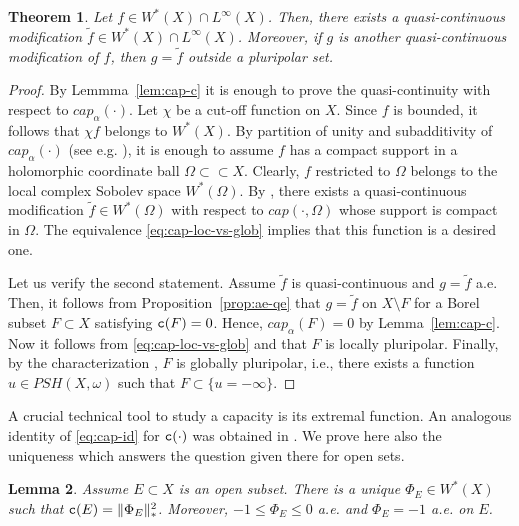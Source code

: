 \documentclass{amsart}
\newcommand{\wt}[1]{\widetilde{#1}}
\newcommand{\al}{\alpha}
\newcommand{\om}{\omega}
\newcommand{\tc}{{\tt c}}
\newcommand{\Om}{\Omega}
\newtheorem{thm}{Theorem}
\newtheorem{lem}[thm]{Lemma}
\theoremstyle{definition}
\numberwithin{thm}{section}
\numberwithin{equation}{section}
\renewcommand{\[}{\begin{equation}}
\renewcommand{\]}{\end{equation}}
\begin{document}
\begin{thm} \label{thm:quasi-mod-bdd} Let $f\in W^*(X) \cap L^\infty(X)$. Then, there exists a quasi-continuous modification $\wt f \in W^*(X) \cap L^\infty(X)$. Moreover, if $g$ is another quasi-continuous modification of $f$, then $g =\wt f$ outside a pluripolar set.
\end{thm}

\begin{proof} By Lemmma~\ref{lem:cap-c} it is enough to prove the quasi-continuity with respect to $cap_\al(\cdot)$. 
 Let $\chi$ be a cut-off function on $X$.  Since $f$ is bounded, it follows that $\chi f$ belongs to $W^*(X)$.  By partition of unity and subadditivity of $cap_\al (\cdot)$ (see e.g. \cite{GZ-book}), it is enough to assume $f$ has a compact support in  a holomorphic coordinate ball $\Om\subset \subset X$. Clearly, $f$ restricted to $\Om$ belongs to  the local complex Sobolev space $W^*(\Om)$. By \cite[Theorem~2.10]{DMV}, there exists a quasi-continuous modification $\wt f \in W^*(\Om)$ with respect to $cap(\cdot, \Om)$ whose support is compact in $\Om$. The equivalence \eqref{eq:cap-loc-vs-glob} implies that this function is a desired one. 

Let us verify the second statement. Assume $\wt f$ is quasi-continuous and $g= \wt f$ a.e. Then, it follows from Proposition~\ref{prop:ae-qe} that $g = \wt f $ on $X\setminus F$ for  a Borel subset $F\subset X$ satisfying $\tc (F) =0$. Hence, $cap_\al(F)=0$ by  Lemma~\ref{lem:cap-c}. Now it follows from \eqref{eq:cap-loc-vs-glob}  and \cite{BT82} that $F$ is locally pluripolar. Finally, by the characterization \cite[Theorem~12.5]{GZ-book},  $F$ is globally pluripolar, i.e., there exists a function $u\in PSH(X,\om)$ such that $F \subset \{u=-\infty\}$.
\end{proof}

A crucial technical tool to study a capacity is its extremal function. An analogous identity of \eqref{eq:cap-id} for $\tc(\cdot)$ was obtained in \cite[Corollary~31]{Vigny}. We prove here also  the uniqueness which answers the question given there for open sets.


\begin{lem} \label{lem:extr-funciton-o} Assume $E\subset X$ is an open subset. There is a unique $\Phi_E \in W^*(X)$ such that 
$\tc (E) = \|\Phi_E\|_*^2$. Moreover, $-1\leq \Phi_E \leq 0$ a.e. and $\Phi_E=-1$ a.e. on $E$.
\end{lem}
\end{document}
